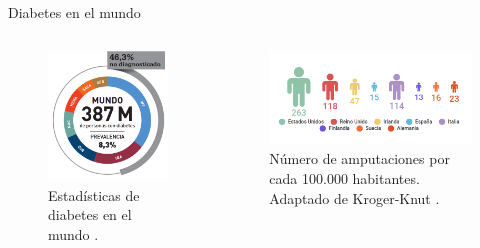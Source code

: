 \documentclass[10pt]{beamer}
\begin{document}
\begin{frame}{Diabetes en el mundo}
\begin{columns}[t]


\column{40 mm}
{\footnotesize{}}

\begin{figure}
\begin{centering}
\includegraphics[scale=0.25]{Feathergraphics/proyecciondiabetes}
\par\end{centering}
\caption{Estadísticas de diabetes en el mundo \cite{ref1}.}
\end{figure}

\column{75 mm}

\begin{figure}
\begin{centering}
\includegraphics[scale=0.30]{Feathergraphics/ampperyear}
\par\end{centering}
\caption{Número de amputaciones por cada 100.000 habitantes. Adaptado de Kroger-Knut \cite{KrogerKnut2015}. }
\end{figure}


\end{columns}
\end{frame}
\end{document}
